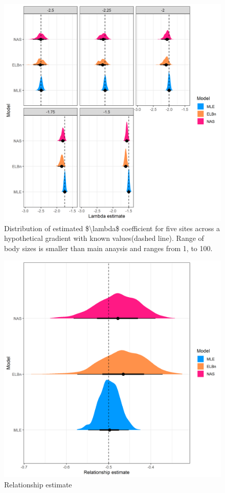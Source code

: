 \documentclass[
]{article}
\begin{document}
\begin{figure}
\centering
\includegraphics{figures/PLB_small_m_est_b_density.png}
\caption{Distribution of estimated \$\textbackslash lambda\$ coefficient
for five sites across a hypothetical gradient with known values(dashed
line). Range of body sizes is smaller than main anaysis and ranges from
1, to 100.}
\end{figure}

\newpage

\begin{figure}
\centering
\includegraphics{figures/PLB_small_m_relationship_density.png}
\caption{Relationship estimate}
\end{figure}
\end{document}
